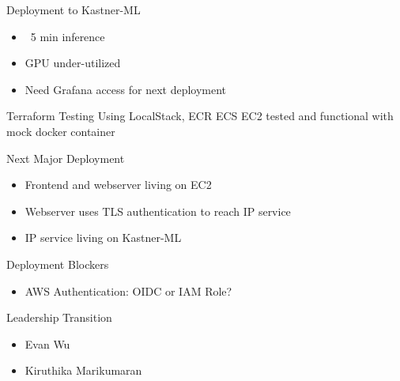 
\begin{frame}{Deployment to Kastner-ML}
    \begin{itemize}
        \item ~5 min inference
        \item GPU under-utilized
        \item Need Grafana access for next deployment
    \end{itemize} 
\end{frame}

\begin{frame}{Terraform Testing}
    Using LocalStack, ECR \rightarrow ECS \righarrow EC2 tested and functional with mock docker container
\end{frame}

\begin{frame}{Next Major Deployment}
    \begin{itemize}
        \item Frontend and webserver living on EC2
        \item Webserver uses TLS authentication to reach IP service
        \item IP service living on Kastner-ML
    \end{itemize}
\end{frame}

\begin{frame}{Deployment Blockers}
    \begin{itemize}
        \item AWS Authentication: OIDC or IAM Role?
    \end{itemize}
\end{frame}

\begin{frame}{Leadership Transition}
    \begin{itemize}
        \item Evan Wu
        \item Kiruthika Marikumaran
    \end{itemize}
\end{frame}



